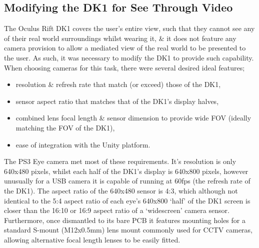 \subsection{Modifying the DK1 for See Through Video}
\label{modifying-dk1}
The Oculus Rift DK1 covers the user's entire view, such that they cannot see any of their real world surroundings whilst wearing it, \& it does not feature any camera provision to allow a mediated view of the real world to be presented to the user. As such, it was necessary to modify the DK1 to provide such capability. When choosing cameras for this task, there were several desired ideal features;
\begin{itemize}
	\item resolution \& refresh rate that match (or exceed) those of the DK1,
	\item sensor aspect ratio that matches that of the DK1's display halves,
	\item combined lens focal length \& sensor dimension to provide wide FOV (ideally matching the FOV of the DK1),
	\item ease of integration with the Unity platform.
\end{itemize}

The PS3 Eye camera met most of these requirements. It's resolution is only 640x480 pixels, whilst each half of the DK1's display is 640x800 pixels, however unusually for a USB camera it is capable of running at 60fps (the refresh rate of the DK1). The aspect ratio of the 640x480 sensor is 4:3, which although not identical to the 5:4 aspect ratio of each eye's 640x800 `half' of the DK1 screen is closer than the 16:10 or 16:9 aspect ratio of a `widescreen' camera sensor. Furthermore, once dismantled to its bare PCB it features mounting holes for a standard S-mount (M12x0.5mm) lens mount commonly used for CCTV cameras, allowing alternative focal length lenses to be easily fitted.

